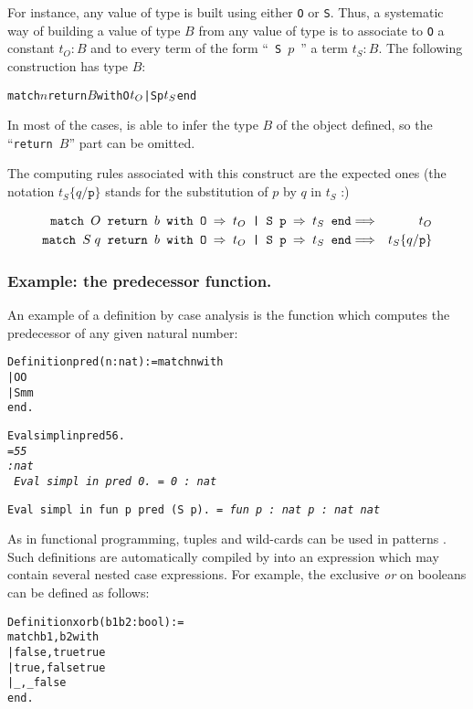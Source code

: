 \documentclass[11pt]{article}
\newcommand{\refmancite}[1]{{}}
\begin{document}
For instance, any value of type {\nat} is built using either \texttt{O} or \texttt{S}.
Thus, a systematic way of building a value of type $B$ from any
value of type {\nat} is to associate to \texttt{O} a constant $t_O:B$ and
to every term of the form ``~\texttt{S $p$}~'' a term $t_S:B$. The following
construction has type $B$:
\begin{alltt}
match \(n\) return \(B\) with O \funarrow \(t\sb{O}\) | S p \funarrow \(t\sb{S}\) end
\end{alltt}


In most of the cases, {\coq} is able to infer the type $B$ of the object
defined, so the ``\texttt{return $B$}'' part can be omitted.

The computing rules associated with this construct are the expected ones
(the notation $t_S\{q/\texttt{p}\}$ stands for the substitution of $p$ by
$q$ in $t_S$ :)

\begin{eqnarray*}
\texttt{match $O$ return $b$ with O {\mbox{$\Rightarrow$}} $t_O$ | S p {\mbox{$\Rightarrow$}} $t_S$ end} &\Longrightarrow& t_O\\
\texttt{match $S\;q$  return $b$ with O {\mbox{$\Rightarrow$}} $t_O$ | S p {\mbox{$\Rightarrow$}} $t_S$ end}  &\Longrightarrow& t_S\{q/\texttt{p}\}
\end{eqnarray*}


\subsubsection{Example: the predecessor function.}\label{firstpred}
An example of a definition by case analysis is the function which
computes the predecessor of any given natural number:
\begin{alltt}
Definition pred (n:nat) := match n with
                                   | O {\funarrow} O
                                   | S m {\funarrow} m
                           end.

Eval simpl in pred 56.
\it{}    = 55
     : nat
\tt
Eval simpl in pred 0.
\it{}    = 0
     : nat

\tt{}Eval simpl in fun p {\funarrow} pred (S p).
\it{}     = fun p : nat {\funarrow} p
     : nat {\arrow} nat
\end{alltt}

As in functional programming, tuples and wild-cards can be used in
patterns \refmancite{Section \ref{ExtensionsOfCases}}. Such
definitions are automatically compiled by {\coq} into an expression which
may contain several nested case expressions. For example, the
exclusive \emph{or} on booleans can be defined as follows:
\begin{alltt}
Definition xorb (b1 b2:bool) :=
 match b1, b2 with
 | false, true {\funarrow} true
 | true, false {\funarrow} true
 | _ , _       {\funarrow} false
 end.
\end{alltt}
\end{document}
